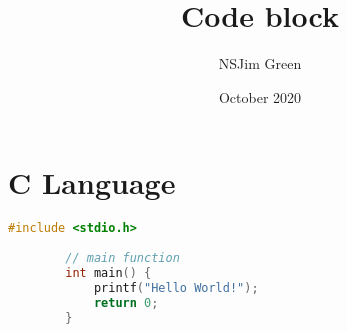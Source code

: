 \documentclass{article}
\title{Code block}
\author{NSJim Green}
\date{October 2020}
\begin{document}
	
	\maketitle
	
	\section{C Language}

	\begin{lstlisting}[language=c]
		#include <stdio.h>
		
		// main function 
		int main() {
			printf("Hello World!");
			return 0;
		}
	\end{lstlisting}
	
\end{document}
